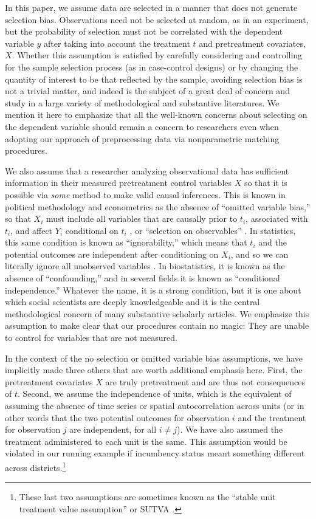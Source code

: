 \documentclass[11pt,titlepage]{article}
\begin{document}
In this paper, we assume data are selected in a manner that does not
generate selection bias.  Observations need not be selected at random,
as in an experiment, but the probability of selection must not be
correlated with the dependent variable $y$ after taking into account
the treatment $t$ and pretreatment covariates, $X$.  Whether this
assumption is satisfied by carefully considering and controlling for
the sample selection process (as in case-control designs) or by
changing the quantity of interest to be that reflected by the sample,
avoiding selection bias is not a trivial matter, and indeed is the
subject of a great deal of concern and study in a large variety of
methodological and substantive literatures.  We mention it here to
emphasize that all the well-known concerns about selecting on the
dependent variable should remain a concern to researchers even when
adopting our approach of preprocessing data via nonparametric matching
procedures.

We also assume that a researcher analyzing observational data has
sufficient information in their measured pretreatment control
variables $X$ so that it is possible via \emph{some} method to make
valid causal inferences.  This is known in political methodology and
econometrics as the absence of ``omitted variable bias,'' so that
$X_i$ must include all variables that are causally prior to $t_i$,
associated with $t_i$, and affect $Y_i$ conditional on $t_i$
\citep{Goldberger91,KinKeoVer94}, or ``selection on observables''
\citep{HecRob85}.  In statistics, this same condition is known as
``ignorability,'' which means that $t_i$ and the potential outcomes
are independent after conditioning on $X_i$, and so we can literally
ignore all unobserved variables \citep{RosRub83}.  In biostatistics,
it is known as the absence of ``confounding,'' and in several fields
it is known as ``conditional independence.''  Whatever the name, it is
a strong condition, but it is one about which social scientists are
deeply knowledgeable and it is the central methodological concern of
many substantive scholarly articles.  We emphasize this assumption to
make clear that our procedures contain no magic: They are unable to
control for variables that are not measured.

In the context of the no selection or omitted variable bias
assumptions, we have implicitly made three others that are worth
additional emphasis here.  First, the pretreatment covariates $X$ are
truly pretreatment and are thus not consequences of $t$.  Second, we
assume the independence of units, which is the equivalent of assuming
the absence of time series or spatial autocorrelation across units (or
in other words that the two potential outcomes for observation $i$ and
the treatment for observation $j$ are independent, for all $i\not=j$).
We have also assumed the treatment administered to each unit is the
same.  This assumption would be violated in our running example if
incumbency status meant something different across
districts.\footnote{These last two assumptions are sometimes known as
  the ``stable unit treatment value assumption'' or SUTVA
  \citep{Rubin74}.}
\end{document}
